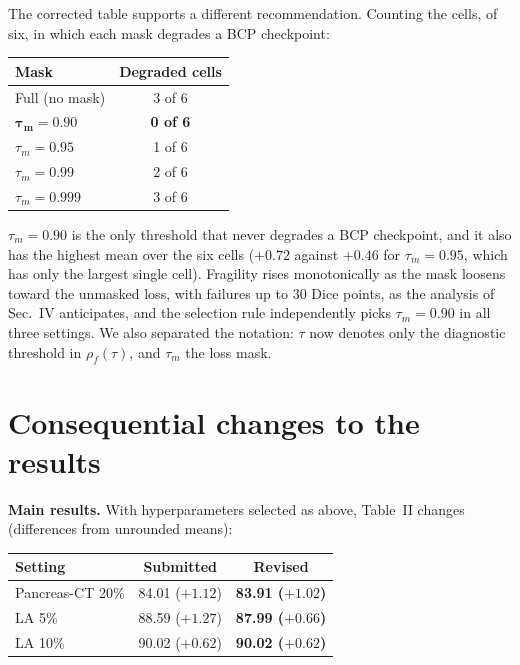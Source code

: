\documentclass[11pt,a4paper]{article}
\begin{document}
The corrected table supports a different recommendation. Counting the cells, of six, in which each mask degrades a BCP checkpoint:

\begin{center}
\begin{tabular}{lc}
\toprule
\textbf{Mask} & \textbf{Degraded cells} \\
\midrule
Full (no mask)               & 3 of 6 \\
$\boldsymbol{\tau_m = 0.90}$ & \textbf{0 of 6} \\
$\tau_m = 0.95$              & 1 of 6 \\
$\tau_m = 0.99$              & 2 of 6 \\
$\tau_m = 0.999$             & 3 of 6 \\
\bottomrule
\end{tabular}
\end{center}

$\tau_m = 0.90$ is the only threshold that never degrades a BCP checkpoint, and it also has the highest mean over the six cells ($+0.72$ against $+0.46$ for $\tau_m=0.95$, which has only the largest single cell). Fragility rises monotonically as the mask loosens toward the unmasked loss, with failures up to 30 Dice points, as the analysis of Sec.~IV anticipates, and the selection rule independently picks $\tau_m=0.90$ in all three settings. We also separated the notation: $\tau$ now denotes only the diagnostic threshold in $\rho_f(\tau)$, and $\tau_m$ the loss mask.

\section*{Consequential changes to the results}

\textbf{Main results.} With hyperparameters selected as above, Table~II changes (differences from unrounded means):

\begin{center}
\begin{tabular}{lcc}
\toprule
\textbf{Setting} & \textbf{Submitted} & \textbf{Revised} \\
\midrule
Pancreas-CT 20\% & 84.01 ($+1.12$) & \textbf{83.91 ($\boldsymbol{+1.02}$)} \\
LA 5\%           & 88.59 ($+1.27$) & \textbf{87.99 ($\boldsymbol{+0.66}$)} \\
LA 10\%          & 90.02 ($+0.62$) & \textbf{90.02 ($\boldsymbol{+0.62}$)} \\
\bottomrule
\end{tabular}
\end{center}
\end{document}
